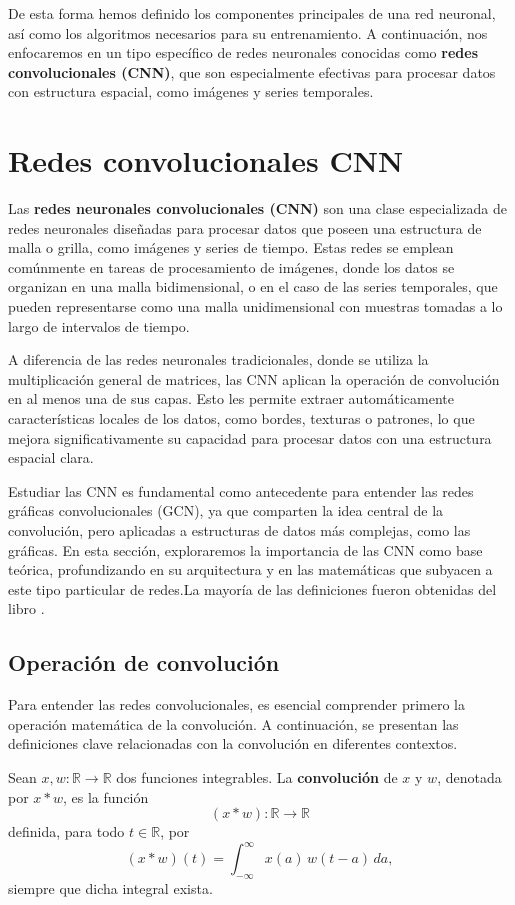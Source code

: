 






De esta forma hemos definido los componentes principales de una red neuronal, así como los algoritmos necesarios para su entrenamiento. A continuación, nos enfocaremos en un tipo específico de redes neuronales conocidas como \textbf{redes convolucionales (CNN)}, que son especialmente efectivas para procesar datos con estructura espacial, como imágenes y series temporales.


\section{Redes convolucionales CNN}
Las \textbf{redes neuronales convolucionales (CNN)} son una clase especializada de redes neuronales diseñadas para procesar datos que poseen una estructura de malla o grilla, como imágenes y series de tiempo. Estas redes se emplean comúnmente en tareas de procesamiento de imágenes, donde los datos se organizan en una malla bidimensional, o en el caso de las series temporales, que pueden representarse como una malla unidimensional con muestras tomadas a lo largo de intervalos de tiempo.

A diferencia de las redes neuronales tradicionales, donde se utiliza la multiplicación general de matrices, las CNN aplican la operación de convolución en al menos una de sus capas. Esto les permite extraer automáticamente características locales de los datos, como bordes, texturas o patrones, lo que mejora significativamente su capacidad para procesar datos con una estructura espacial clara.

Estudiar las CNN es fundamental como antecedente para entender las redes gráficas convolucionales (GCN), ya que comparten la idea central de la convolución, pero aplicadas a estructuras de datos más complejas, como las gráficas. En esta sección, exploraremos la importancia de las CNN como base teórica, profundizando en su arquitectura y en las matemáticas que subyacen a este tipo particular de redes.La mayoría de las definiciones fueron obtenidas del libro \cite{Goodfellow-et-al-2016}.

\subsection{Operación de convolución}

Para entender las redes convolucionales, es esencial comprender primero la operación matemática de la convolución. A continuación, se presentan las definiciones clave relacionadas con la convolución en diferentes contextos.
\begin{definition}[Convolución]
    Sean $x, w : \mathbb{R} \to \mathbb{R}$ dos funciones integrables. La \textbf{convolución} de $x$ y $w$, denotada por $x \ast w$, es la función
    \[
        (x \ast w) : \mathbb{R} \to \mathbb{R}
    \]
    definida, para todo $t \in \mathbb{R}$, por
    \[
        (x \ast w)(t) = \int_{-\infty}^{\infty} x(a)\, w(t - a)\, da,
    \]
    siempre que dicha integral exista.
\end{definition}

